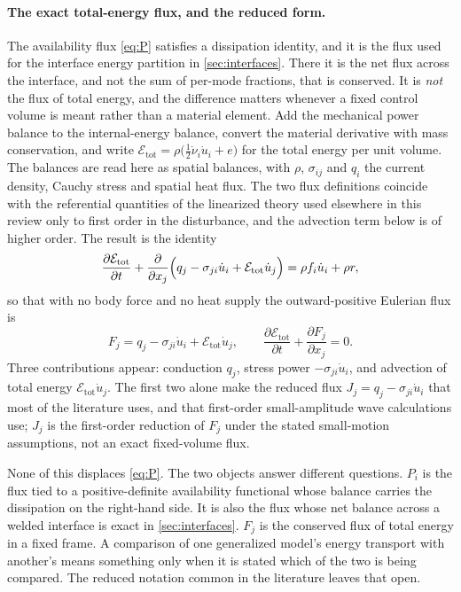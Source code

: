 \paragraph{The exact total-energy flux, and the reduced form.}
The availability flux \eqref{eq:P} satisfies a dissipation identity, and it is the flux used for the interface energy partition in \cref{sec:interfaces}. There it is the net flux across the interface, and not the sum of per-mode fractions, that is conserved. It is \emph{not} the flux of
total energy, and the difference matters whenever a fixed control volume is meant rather than a material
element. Add the mechanical power balance to the internal-energy balance, convert the material
derivative with mass conservation, and write $\mathcal E_{\mathrm{tot}}=\rho\bigl(\tfrac12\dot\nu_i\dot u_i+e\bigr)$ for the total energy per unit volume. The balances are read here as spatial balances, with $\rho$, $\sigma_{ij}$ and $q_i$ the current density, Cauchy stress and spatial heat flux. The two flux definitions coincide with the referential quantities of the linearized theory used elsewhere in this review only to first order in the disturbance, and the advection term below is of higher order. The result is the identity
\begin{equation}\label{eq:exactflux}
\frac{\partial \mathcal E_{\mathrm{tot}}}{\partial t}
+\frac{\partial}{\partial x_j}\Bigl(q_j-\sigma_{ji}\dot u_i+\mathcal E_{\mathrm{tot}}\dot u_j\Bigr)
=\rho f_i\dot u_i+\rho r ,
\end{equation}
so that with no body force and no heat supply the outward-positive Eulerian flux is
\begin{equation}\label{eq:exactflux-balance}
F_j=q_j-\sigma_{ji}\dot u_i+\mathcal E_{\mathrm{tot}}\dot u_j,
\qquad
\frac{\partial \mathcal E_{\mathrm{tot}}}{\partial t}+\frac{\partial F_j}{\partial x_j}=0 .
\end{equation}
Three contributions appear: conduction $q_j$, stress power $-\sigma_{ji}\dot u_i$, and advection of
total energy $\mathcal E_{\mathrm{tot}}\dot u_j$. The first two alone make the reduced flux
$J_j=q_j-\sigma_{ji}\dot u_i$ that most of the literature uses, and that first-order small-amplitude
wave calculations use; $J_j$ is the first-order reduction of $F_j$ under the stated small-motion
assumptions, not an exact fixed-volume flux.

None of this displaces \eqref{eq:P}. The two objects answer different questions. $P_i$ is the flux tied
to a positive-definite availability functional whose balance carries the dissipation on the right-hand
side. It is also the flux whose net balance across a welded interface is exact in \cref{sec:interfaces}. $F_j$ is the
conserved flux of total energy in a fixed frame. A comparison of one generalized model's energy transport with
another's means something only when it is stated which of the two is being compared. The
reduced notation common in the literature leaves that open.



